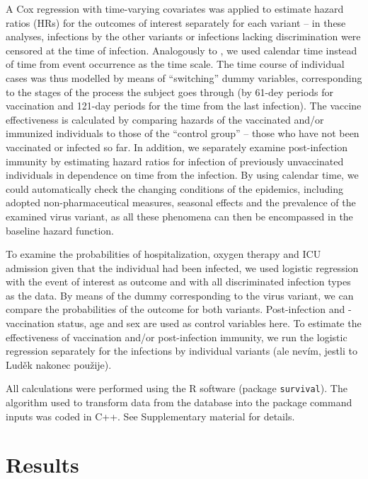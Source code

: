\documentclass[preprint,12pt,authoryear]{elsarticle}
\begin{document}
A Cox regression with time-varying covariates was applied to estimate hazard ratios (HRs) for the outcomes of interest separately for each variant -- in these analyses,  infections by the other variants or infections lacking discrimination were censored at the time of infection. Analogously to \cite{tartof2021effectiveness}, we used calendar time instead of time from event occurrence as the time scale. The time course of individual cases was thus modelled by means of ``switching'' dummy variables, corresponding to the stages of the process the subject goes through (by 61-dey periods for vaccination and 121-day periods for the time from the last infection).
The vaccine effectiveness is calculated by comparing hazards of the vaccinated and/or immunized individuals to those of the  ``control group'' -- those who have not been vaccinated or infected so far. In addition, we separately examine post-infection immunity by estimating hazard ratios for infection of previously unvaccinated individuals in dependence on  time from the infection. By using calendar time, we could automatically check the changing conditions of the epidemics, including adopted non-pharmaceutical measures, seasonal effects and the prevalence of the examined virus variant, as all these phenomena can then be encompassed in the baseline hazard function. 






To examine the probabilities of hospitalization, oxygen therapy and ICU admission given that the individual had been infected, we used logistic regression with the event of interest as outcome and with all discriminated infection types as the data. By means of the dummy corresponding to the virus variant, we can compare the probabilities of the outcome for both variants. Post-infection and -vaccination status, age and sex are used as control variables here. To estimate the effectiveness of vaccination and/or post-infection immunity, we run the logistic regression separately for the infections by individual variants (ale nevím, jestli to Luděk nakonec použije).

 
All calculations were performed using the R software (package \verb|survival|). The algorithm used to transform data from the database into the package command inputs was coded in C++. See Supplementary material for details. 

\section{Results}
\label{sec3}
\end{document}
